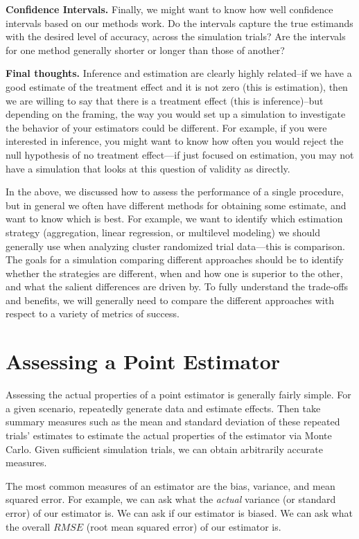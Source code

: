\documentclass[
]{book}
\begin{document}
\textbf{Confidence Intervals.}
Finally, we might want to know how well confidence intervals based on our methods work.
Do the intervals capture the true estimands with the desired level of accuracy, across the simulation trials?
Are the intervals for one method generally shorter or longer than those of another?

\textbf{Final thoughts.}
Inference and estimation are clearly highly related--if we have a good estimate of the treatment effect and it is not zero (this is estimation), then we are willing to say that there is a treatment effect (this is inference)--but depending on the framing, the way you would set up a simulation to investigate the behavior of your estimators could be different.
For example, if you were interested in inference, you might want to know how often you would reject the null hypothesis of no treatment effect---if just focused on estimation, you may not have a simulation that looks at this question of validity as directly.

In the above, we discussed how to assess the performance of a single procedure, but in general we often have different methods for obtaining some estimate, and want to know which is best.
For example, we want to identify which estimation strategy (aggregation, linear regression, or multilevel modeling) we should generally use when analyzing cluster randomized trial data---this is comparison.
The goals for a simulation comparing different approaches should be to identify whether the strategies are different, when and how one is superior to the other, and what the salient differences are driven by.
To fully understand the trade-offs and benefits, we will generally need to compare the different approaches with respect to a variety of metrics of success.

\section{Assessing a Point Estimator}\label{assessing-a-point-estimator}

Assessing the actual properties of a point estimator is generally fairly simple.
For a given scenario, repeatedly generate data and estimate effects.
Then take summary measures such as the mean and standard deviation of these repeated trials' estimates to estimate the actual properties of the estimator via Monte Carlo.
Given sufficient simulation trials, we can obtain arbitrarily accurate measures.

The most common measures of an estimator are the bias, variance, and mean squared error.
For example, we can ask what the \emph{actual} variance (or standard error) of our estimator is.
We can ask if our estimator is biased.
We can ask what the overall \(RMSE\) (root mean squared error) of our estimator is.
\end{document}
